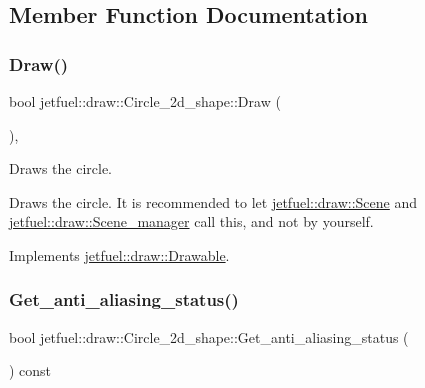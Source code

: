 \subsection{Member Function Documentation}
\mbox{\label{classjetfuel_1_1draw_1_1Circle__2d__shape_a8be660f3cd624dc077d9003ee3b37212}} 
\subsubsection{\texorpdfstring{Draw()}{Draw()}}
{\footnotesize\ttfamily bool jetfuel\+::draw\+::\+Circle\+\_\+2d\+\_\+shape\+::\+Draw (\begin{DoxyParamCaption}{ }\end{DoxyParamCaption})\hspace{0.3cm}{\ttfamily [override]}, {\ttfamily [virtual]}}



Draws the circle. 

Draws the circle. It is recommended to let \hyperlink{classjetfuel_1_1draw_1_1Scene}{jetfuel\+::draw\+::\+Scene} and \hyperlink{classjetfuel_1_1draw_1_1Scene__manager}{jetfuel\+::draw\+::\+Scene\+\_\+manager} call this, and not by yourself. 

Implements \hyperlink{classjetfuel_1_1draw_1_1Drawable_a1a072070322965ce9411ee6e7c311c56}{jetfuel\+::draw\+::\+Drawable}.

\mbox{\label{classjetfuel_1_1draw_1_1Circle__2d__shape_af5e8ebfd4c5102e25263500c0a2075b9}} 
\subsubsection{\texorpdfstring{Get\+\_\+anti\+\_\+aliasing\+\_\+status()}{Get\_anti\_aliasing\_status()}}
{\footnotesize\ttfamily bool jetfuel\+::draw\+::\+Circle\+\_\+2d\+\_\+shape\+::\+Get\+\_\+anti\+\_\+aliasing\+\_\+status (\begin{DoxyParamCaption}{ }\end{DoxyParamCaption}) const\hspace{0.3cm}{\ttfamily [inline]}}



